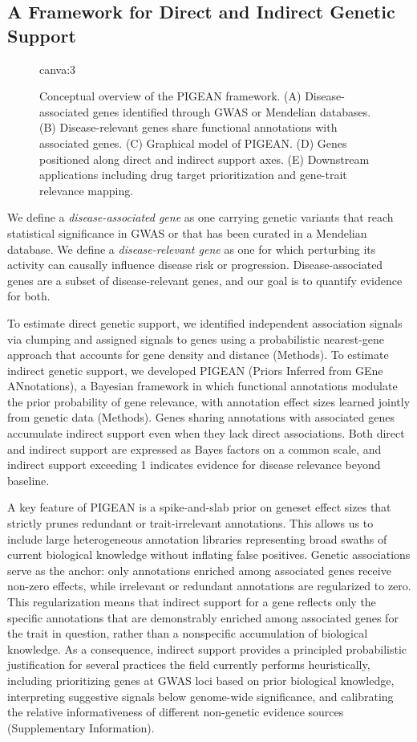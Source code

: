 \subsection{A Framework for Direct and Indirect Genetic Support}

\begin{figure}[t!]
    \centering
    {{canva:3}}
    \caption{Conceptual overview of the PIGEAN framework. (A) Disease-associated genes identified through GWAS or Mendelian databases. (B) Disease-relevant genes share functional annotations with associated genes. (C) Graphical model of PIGEAN. (D) Genes positioned along direct and indirect support axes. (E) Downstream applications including drug target prioritization and gene-trait relevance mapping.}
    \label{fig:pigean-method}
\end{figure}

We define a \textit{disease-associated gene} as one carrying genetic variants that reach statistical significance in GWAS or that has been curated in a Mendelian database. We define a \textit{disease-relevant gene} as one for which perturbing its activity can causally influence disease risk or progression. Disease-associated genes are a subset of disease-relevant genes, and our goal is to quantify evidence for both.

To estimate direct genetic support, we identified independent association signals via clumping and assigned signals to genes using a probabilistic nearest-gene approach that accounts for gene density and distance \cite{dornbos_evaluating_2022} (Methods). To estimate indirect genetic support, we developed PIGEAN (Priors Inferred from GEne ANnotations), a Bayesian framework in which functional annotations modulate the prior probability of gene relevance, with annotation effect sizes learned jointly from genetic data (Methods). Genes sharing annotations with associated genes accumulate indirect support even when they lack direct associations. Both direct and indirect support are expressed as Bayes factors on a common scale, and indirect support exceeding 1 indicates evidence for disease relevance beyond baseline.

A key feature of PIGEAN is a spike-and-slab prior on geneset effect sizes that strictly prunes redundant or trait-irrelevant annotations. This allows us to include large heterogeneous annotation libraries representing broad swaths of current biological knowledge without inflating false positives. Genetic associations serve as the anchor: only annotations enriched among associated genes receive non-zero effects, while irrelevant or redundant annotations are regularized to zero. This regularization means that indirect support for a gene reflects only the specific annotations that are demonstrably enriched among associated genes for the trait in question, rather than a nonspecific accumulation of biological knowledge. As a consequence, indirect support provides a principled probabilistic justification for several practices the field currently performs heuristically, including prioritizing genes at GWAS loci based on prior biological knowledge, interpreting suggestive signals below genome-wide significance, and calibrating the relative informativeness of different non-genetic evidence sources (Supplementary Information).


